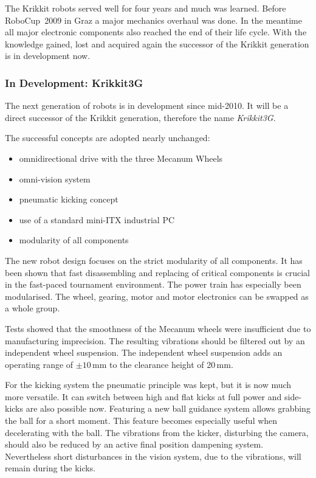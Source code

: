 \documentclass[12pt,a4paper]{article}
\begin{document}
The Krikkit robots served well for four years and much was learned.
Before RoboCup~2009 in Graz a major mechanics overhaul was done.
In the meantime all major electronic components also reached the end of their life cycle.
With the knowledge gained, lost and acquired again the successor of the Krikkit generation is in development now.
    

\subsubsection{In Development: Krikkit3G}

The next generation of robots is in development since mid-2010.
It will be a direct successor of the Krikkit generation, therefore the name \emph{Krikkit3G}.

The successful concepts are adopted nearly unchanged:\nopagebreak[4] %
\begin{itemize}
  \item omnidirectional drive with the three Mecanum Wheels
  \item omni-vision system
  \item pneumatic kicking concept
  \item use of a standard mini-ITX industrial PC
  \item modularity of all components
\end{itemize}

The new robot design focuses on the strict modularity of all components.
It has been shown that fast disassembling and replacing of critical components is crucial in the fast-paced tournament environment.
The power train has especially been modularised.
The wheel, gearing, motor and motor electronics can be swapped as a whole group.

Tests showed that the smoothness of the Mecanum wheels were insufficient due to manufacturing imprecision.
The resulting vibrations should be filtered out by an independent wheel suspension.
The independent wheel suspension adds an  operating range of $\pm 10$\,mm to the clearance height of 20\,mm.


For the kicking system the pneumatic principle was kept, but it is now much more versatile. 
It can switch between high and flat kicks at full power and side-kicks are also possible now.
Featuring a new ball guidance system allows grabbing the ball for a short moment.
This feature becomes especially useful when decelerating with the ball.
The vibrations from the kicker, disturbing the camera, should also be reduced by an active final position dampening system.
Nevertheless short disturbances in the vision system, due to the vibrations, will remain during the kicks.
\end{document}
